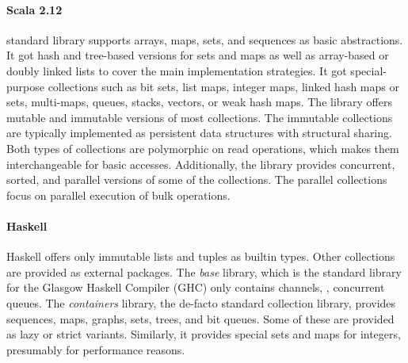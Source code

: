 \documentclass[sigconf, 10pt]{acmart}
\begin{document}
\paragraph{Scala 2.12}
\label{sec:scala-col}

 standard library
supports arrays, maps, sets, and sequences as basic abstractions.
It got hash and tree-based versions for sets and maps
as well as array-based or doubly linked lists
to cover the main implementation strategies.
It got special-purpose collections
such as bit sets, list maps, integer maps, linked hash maps or sets, multi-maps,
queues, stacks, vectors, or weak hash maps.
The library offers mutable and immutable versions
of most collections.
The immutable collections are typically implemented
as persistent data structures with structural sharing.
Both types of collections are polymorphic on read operations,
which makes them interchangeable for basic accesses.
Additionally, the library provides concurrent, sorted,
and parallel versions of some of the collections.
The parallel collections focus on parallel execution of bulk operations.

%

\paragraph{Haskell}


Haskell offers only immutable lists and tuples as builtin types.
Other collections are provided as external packages.
The \emph{base} library,
which is the standard library for the Glasgow Haskell Compiler (GHC)
only contains channels, \ie, concurrent queues.
The \emph{containers} library, the de-facto standard collection library,
provides sequences, maps, graphs, sets, trees, and bit queues.
Some of these are provided as lazy or strict variants.
Similarly, it provides special sets and maps for integers,
presumably for performance reasons.
\end{document}
